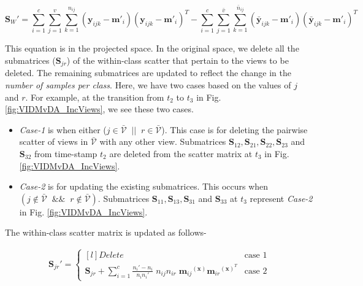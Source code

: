 \begin{equation}
\label{eqn:VIDMvDA_Del_Sw}
\mathbf{S}_W' = \sum_{i=1}^{c} \sum_{j=1}^{v} \sum_{k=1}^{n_{ij}} \left ( \mathbf{y}_{ijk} - \textbf{m}'_i \right ) \left ( \mathbf{y}_{ijk} - \textbf{m}'_i \right )^T - \sum_{i=1}^{c} \sum_{j=1}^{\bar{v}} \sum_{k=1}^{\bar{n}_{ij}} \left ( \bar{\mathbf{y}}_{ijk} - \textbf{m}'_i \right ) \left ( \bar{\mathbf{y}}_{ijk} - \textbf{m}'_i \right )^T
\end{equation}

This equation is in the projected space. In the original space, we delete all the submatrices ($\textbf{S}_{jr}$) of the within-class scatter that pertain to the views to be deleted. The remaining submatrices are updated to reflect the change in the \textit{number of samples per class}. Here, we have two cases based on the values of $j$ and $r$. For example, at the transition from $t_2$ to $t_3$ in Fig. \ref{fig:VIDMvDA_IncViews}, we see these two cases.
\begin{itemize}
	\item \textit{Case-1} is when either ($j \in \bar{\mathcal{V}} \;\;||\;\; r \in \bar{\mathcal{V}}$). This case is for deleting the pairwise scatter of views in $\bar{\mathcal{V}}$ with any other view. Submatrices $\textbf{S}_{12}, \textbf{S}_{21}, \textbf{S}_{22}, \textbf{S}_{23}$ and $\textbf{S}_{32}$ from time-stamp $t_2$ are deleted from the scatter matrix at $t_3$ in Fig. \ref{fig:VIDMvDA_IncViews}.
	\item \textit{Case-2} is for updating the existing submatrices. This occurs when $(j \notin \bar{\mathcal{V}} \;\;\&\&\;\; r \notin \bar{\mathcal{V}})$. Submatrices $\textbf{S}_{11}, \textbf{S}_{13}, \textbf{S}_{31}$ and $\textbf{S}_{33}$ at $t_3$ represent \textit{Case-2} in Fig. \ref{fig:VIDMvDA_IncViews}.
\end{itemize}

The within-class scatter matrix is updated as follows-

\begin{equation}
\label{eqn:VIDMvDA_Del_Sjr}
\begin{split}
\textbf{S}_{jr}' = \left\{\begin{matrix*}[l]
Delete & \text{case 1}
\\[0.4cm]
\textbf{S}_{jr} + \sum\limits_{i=1}^{c}  \frac{n_i' - n_i}{n_i n_i'} \; n_{ij} n_{ir} \; {\textbf{m}_{ij}}^{(\textbf{x})} {\textbf{m}_{ir}}^{(\textbf{x})^T} & \text{case 2}
\end{matrix*}\right.
\end{split}
\end{equation}

